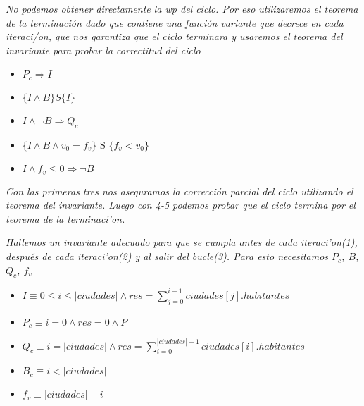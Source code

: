 \documentclass[10pt,a4paper]{article}
\begin{document}
	\begin{demoPc}
		\[\]\textsl{No podemos obtener directamente la wp del ciclo. Por eso utilizaremos el teorema de la terminación dado que contiene una función variante que decrece en cada iteraci/on, que nos garantiza que el ciclo terminara y usaremos el teorema del invariante para probar la correctitud del ciclo }
		
		
		
		\begin{itemize}
			\item $P_c \Rightarrow I$
			\item $ \{I \land B \} S \{ I \}$
			\item $I \land \neg B \Rightarrow Q_c$
			\item $ \{I \land B \land v_{0}=f_{v} \}$ S $\{f_{v} < v_{0}\}$
			\item $I \land f_{v} \leq 0 \Rightarrow \neg B$
		\end{itemize}
		
		\noindent
		\textsl{Con las primeras tres nos aseguramos la corrección parcial del ciclo utilizando el teorema del invariante. Luego con 4-5 podemos probar que el ciclo termina por el teorema de la terminaci'on.}
		
		\noindent
		\textsl{Hallemos un invariante adecuado para que se cumpla antes de cada iteraci'on(1),
			después de cada iteraci'on(2) y al salir del bucle(3). Para esto necesitamos $P_c$, $B$, $Q_c$, $f_{v}$}\\
		
		\par	
		\begin{itemize}
			
			\item $I \equiv 0 \leq i \leq |ciudades| \land res= \sum_{j=0}^{i-1} ciudades[j].habitantes$
			\item $P_{c} \equiv i =0 \land res=0 \land P$
			\item $Q_{c}\equiv i=\lvert ciudades\rvert \land  res= \sum_{i=0}^{|ciudades|-1} ciudades[i].habitantes$ 
			\item $B_{c} \equiv i < \lvert ciudades \rvert$
			\item $f_{v} \equiv \lvert ciudades \rvert - i$
			\nonumber
			
		\end{itemize}
		
		\newtheorem*{demo1}{Demostración $P_{c} \Rightarrow I$}
		\newtheorem*{demo2}{Demostración $ \{I \land B \} S \{ I \}${\newline}}
		\newtheorem*{demo3}{Demostración $I \land \neg B \Rightarrow Q_c$}
		\newtheorem*{demo4}{Demostración $(I \land \neg B \land v_{0}=f_{v}) S (f_{v} < v_{0})${\newline}}
		\newtheorem*{demo5}{Demostración $I \land f_{v} \leq 0 \Rightarrow \neg B$}
		

\end{demoPc}
\end{document}
